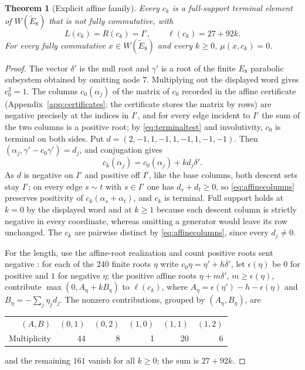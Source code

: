 \documentclass[10pt]{article}
\newtheorem{theorem}{Theorem}[section]
\theoremstyle{remark}
\begin{document}
\begin{theorem}[Explicit affine family]\label{thm:affine}
Every $c_k$ is a full-support terminal element of $W(\widetilde E_8)$ that
is not fully commutative, with
\[
 L(c_k)=R(c_k)=I',\qquad\ell(c_k)=27+92k.
\]
For every fully commutative $x\in W(\widetilde E_8)$ and every $k\geq0$,
$\mu(x,c_k)=0$.
\end{theorem}
\begin{proof}
The vector $\delta'$ is the null root and $\gamma'$ is a root of the
finite $E_8$ parabolic subsystem obtained by omitting node $7$.
Multiplying out the displayed word gives $c_0^2=1$. The columns
$c_0(\alpha_j)$ of the matrix of $c_0$ recorded in the affine certificate
(Appendix~\ref{app:certificates}; the certificate stores the matrix by rows)
are negative precisely at the indices
in $I'$, and for every edge incident to $I'$ the sum of the two columns is
a positive root; by \eqref{eq:terminaltest} and involutivity, $c_0$ is
terminal on both sides. Put $d=(2,-1,1,-1,1,-1,1,-1,-1)$. Then
$(\alpha_j,\gamma'-c_0\gamma')=d_j$, and conjugation gives
\begin{equation}\label{eq:affinecolumns}
 c_k(\alpha_j)=c_0(\alpha_j)+kd_j\delta'.
\end{equation}
As $d$ is negative on $I'$ and positive off $I'$, like the base columns,
both descent sets stay $I'$; on every edge $s\sim t$ with $s\in I'$ one
has $d_s+d_t\geq0$, so \eqref{eq:affinecolumns} preserves positivity of
$c_k(\alpha_s+\alpha_t)$, and $c_k$ is terminal. Full support holds at
$k=0$ by the displayed word and at $k\geq1$ because each descent column is
strictly negative in every coordinate, whereas omitting a generator would
leave its row unchanged. The $c_k$ are pairwise distinct by
\eqref{eq:affinecolumns}, since every $d_j\neq0$.

For the length, use the affine-root realization
\cite[\S\S4.1--4.3 and \S6.5]{Humphreys} and count positive roots sent
negative \cite[Proposition~4.4.4]{BB}: for each of the $240$ finite
roots $\eta$ write $c_0\eta=\eta'+h\delta'$, let $\epsilon(\eta)$ be $0$
for positive and $1$ for negative $\eta$; the positive affine roots
$\eta+m\delta'$, $m\geq\epsilon(\eta)$, contribute
$\max(0,A_\eta+kB_\eta)$ to $\ell(c_k)$, where
$A_\eta=\epsilon(\eta')-h-\epsilon(\eta)$ and $B_\eta=-\sum_j\eta_jd_j$.
The nonzero contributions, grouped by $(A_\eta,B_\eta)$, are
\begin{center}
\begin{tabular}{@{}rrrrrr@{}}
\toprule
$(A,B)$ & $(0,1)$ & $(0,2)$ & $(1,0)$ & $(1,1)$ & $(1,2)$\\
Multiplicity & 44 & 8 & 1 & 20 & 6\\
\bottomrule
\end{tabular}
\end{center}
and the remaining $161$ vanish for all $k\geq0$; the sum is $27+92k$.


\end{proof}
\end{document}
